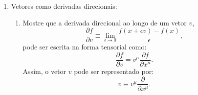 \begin{enumerate}
\begin{enumerate}
                  \item Suponha que o emissor está em movimento com velocidade $v$ e o
                        observador está em repouso à direita. Calcule a frequência
                        (própria) observada $\nu_o$ em função da frequência (própria)
                        emitida $\nu_e$, obtendo:
                        $$
                              \nu_o = \nu_e \sqrt{\frac{1 + \beta}{1 - \beta}}, \quad \beta = \frac{v}{c}
                        $$

                  \item Repita o cálculo no referencial em que o emissor está em repouso
                        e o observador se move com velocidade $-v$. Mostre que o resultado
                        obtido é o mesmo, reforçando a consistência do efeito Doppler
                        relativístico sob transformações de Lorentz.
            \end{enumerate}

      \item Vetores como derivadas direcionais:
            \begin{enumerate}
                  \item Mostre que a derivada direcional ao longo de um vetor $v$,
                        $$
                              \frac{\partial f}{\partial v} \equiv \lim_{\epsilon \to 0}
                              \frac{f(x + \epsilon v) - f(x)}{\epsilon},
                        $$
                        pode ser escrita na forma tensorial como:
                        $$
                              \frac{\partial f}{\partial v} = v^\mu \frac{\partial f}{\partial x^\mu}.
                        $$
                        Assim, o vetor $v$ pode ser representado por:
                        $$
                              v \equiv v^\mu \frac{\partial }{\partial x^\mu}.
                        $$


\end{enumerate}
\end{enumerate}
